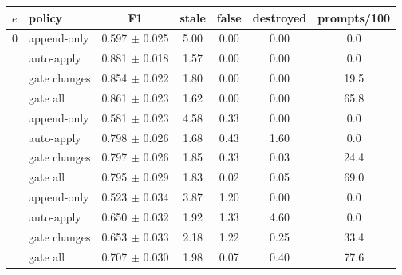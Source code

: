 \begin{tabular}{llccccc}
\toprule
$e$ & policy & F1 & stale & false & destroyed & prompts/100 \\
\midrule
0 & append-only & 0.597 $\pm$ 0.025 & 5.00 & 0.00 & 0.00 & 0.0 \\
 & auto-apply & 0.881 $\pm$ 0.018 & 1.57 & 0.00 & 0.00 & 0.0 \\
 & gate changes & 0.854 $\pm$ 0.022 & 1.80 & 0.00 & 0.00 & 19.5 \\
 & gate all & 0.861 $\pm$ 0.023 & 1.62 & 0.00 & 0.00 & 65.8 \\
\addlinespace[2pt]
0.1 & append-only & 0.581 $\pm$ 0.023 & 4.58 & 0.33 & 0.00 & 0.0 \\
 & auto-apply & 0.798 $\pm$ 0.026 & 1.68 & 0.43 & 1.60 & 0.0 \\
 & gate changes & 0.797 $\pm$ 0.026 & 1.85 & 0.33 & 0.03 & 24.4 \\
 & gate all & 0.795 $\pm$ 0.029 & 1.83 & 0.02 & 0.05 & 69.0 \\
\addlinespace[2pt]
0.3 & append-only & 0.523 $\pm$ 0.034 & 3.87 & 1.20 & 0.00 & 0.0 \\
 & auto-apply & 0.650 $\pm$ 0.032 & 1.92 & 1.33 & 4.60 & 0.0 \\
 & gate changes & 0.653 $\pm$ 0.033 & 2.18 & 1.22 & 0.25 & 33.4 \\
 & gate all & 0.707 $\pm$ 0.030 & 1.98 & 0.07 & 0.40 & 77.6 \\
\bottomrule
\end{tabular}
